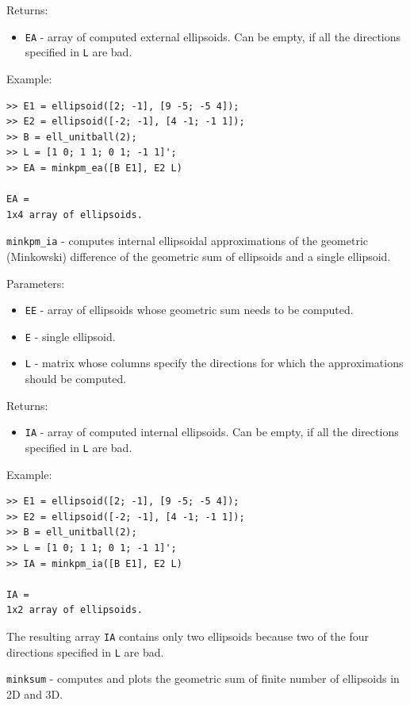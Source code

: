 \documentclass{report}
\begin{document}
Returns:
\begin{itemize}
\item {\tt EA} - array of computed external ellipsoids. Can be empty, if
all the directions specified in {\tt L} are bad.
\end{itemize}

Example:
{\tt \begin{verbatim}
>> E1 = ellipsoid([2; -1], [9 -5; -5 4]);
>> E2 = ellipsoid([-2; -1], [4 -1; -1 1]);
>> B = ell_unitball(2);
>> L = [1 0; 1 1; 0 1; -1 1]';
>> EA = minkpm_ea([B E1], E2 L)

EA =
1x4 array of ellipsoids.
\end{verbatim} }

\newpage

{\Large {\tt minkpm\_ia}} - computes internal ellipsoidal approximations
of the geometric (Minkowski) difference of the geometric sum of ellipsoids
and a single ellipsoid.

Parameters:
\begin{itemize}
\item {\tt EE} - array of ellipsoids whose geometric sum needs to be computed.
\item {\tt E} - single ellipsoid.
\item {\tt L} - matrix whose columns specify the directions for which
the approximations should be computed.
\end{itemize}

Returns:
\begin{itemize}
\item {\tt IA} - array of computed internal ellipsoids. Can be empty, if
all the directions specified in {\tt L} are bad.
\end{itemize}

Example:
{\tt \begin{verbatim}
>> E1 = ellipsoid([2; -1], [9 -5; -5 4]);
>> E2 = ellipsoid([-2; -1], [4 -1; -1 1]);
>> B = ell_unitball(2);
>> L = [1 0; 1 1; 0 1; -1 1]';
>> IA = minkpm_ia([B E1], E2 L)

IA =
1x2 array of ellipsoids.
\end{verbatim} }
The resulting array {\tt IA} contains only two ellipsoids because two
of the four directions specified in {\tt L} are bad.

\newpage

{\Large {\tt minksum}} - computes and plots the geometric sum of finite
number of ellipsoids in 2D and 3D.
\end{document}

